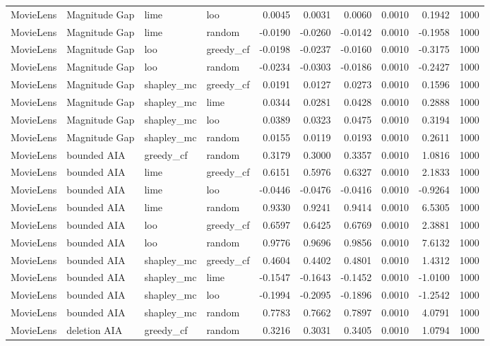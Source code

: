 \begin{longtable}{@{}p{.12\linewidth}p{.18\linewidth}p{.13\linewidth}p{.13\linewidth}rrrrrr@{}}
MovieLens & Magnitude Gap & lime & loo & 0.0045 & 0.0031 & 0.0060 & 0.0010 & 0.1942 & 1000 \\
MovieLens & Magnitude Gap & lime & random & -0.0190 & -0.0260 & -0.0142 & 0.0010 & -0.1958 & 1000 \\
MovieLens & Magnitude Gap & loo & greedy\_cf & -0.0198 & -0.0237 & -0.0160 & 0.0010 & -0.3175 & 1000 \\
MovieLens & Magnitude Gap & loo & random & -0.0234 & -0.0303 & -0.0186 & 0.0010 & -0.2427 & 1000 \\
MovieLens & Magnitude Gap & shapley\_mc & greedy\_cf & 0.0191 & 0.0127 & 0.0273 & 0.0010 & 0.1596 & 1000 \\
MovieLens & Magnitude Gap & shapley\_mc & lime & 0.0344 & 0.0281 & 0.0428 & 0.0010 & 0.2888 & 1000 \\
MovieLens & Magnitude Gap & shapley\_mc & loo & 0.0389 & 0.0323 & 0.0475 & 0.0010 & 0.3194 & 1000 \\
MovieLens & Magnitude Gap & shapley\_mc & random & 0.0155 & 0.0119 & 0.0193 & 0.0010 & 0.2611 & 1000 \\
MovieLens & bounded AIA & greedy\_cf & random & 0.3179 & 0.3000 & 0.3357 & 0.0010 & 1.0816 & 1000 \\
MovieLens & bounded AIA & lime & greedy\_cf & 0.6151 & 0.5976 & 0.6327 & 0.0010 & 2.1833 & 1000 \\
MovieLens & bounded AIA & lime & loo & -0.0446 & -0.0476 & -0.0416 & 0.0010 & -0.9264 & 1000 \\
MovieLens & bounded AIA & lime & random & 0.9330 & 0.9241 & 0.9414 & 0.0010 & 6.5305 & 1000 \\
MovieLens & bounded AIA & loo & greedy\_cf & 0.6597 & 0.6425 & 0.6769 & 0.0010 & 2.3881 & 1000 \\
MovieLens & bounded AIA & loo & random & 0.9776 & 0.9696 & 0.9856 & 0.0010 & 7.6132 & 1000 \\
MovieLens & bounded AIA & shapley\_mc & greedy\_cf & 0.4604 & 0.4402 & 0.4801 & 0.0010 & 1.4312 & 1000 \\
MovieLens & bounded AIA & shapley\_mc & lime & -0.1547 & -0.1643 & -0.1452 & 0.0010 & -1.0100 & 1000 \\
MovieLens & bounded AIA & shapley\_mc & loo & -0.1994 & -0.2095 & -0.1896 & 0.0010 & -1.2542 & 1000 \\
MovieLens & bounded AIA & shapley\_mc & random & 0.7783 & 0.7662 & 0.7897 & 0.0010 & 4.0791 & 1000 \\
MovieLens & deletion AIA & greedy\_cf & random & 0.3216 & 0.3031 & 0.3405 & 0.0010 & 1.0794 & 1000 \\

\end{longtable}
